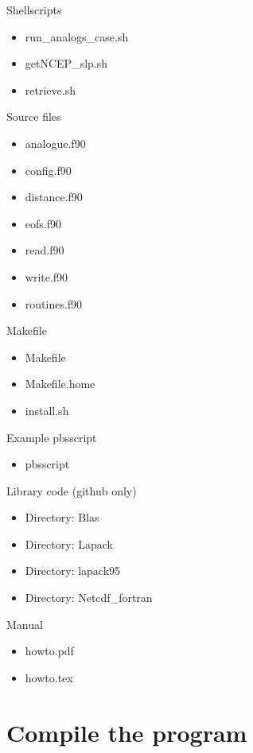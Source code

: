 \documentclass[11p,a4paper]{article}
\begin{document}
Shellscripts
\begin{itemize}
 \item run\_analogs\_case.sh
 \item getNCEP\_slp.sh 
 \item retrieve.sh
\end{itemize}
Source files
\begin{itemize}
 \item analogue.f90  
 \item config.f90  
 \item distance.f90  
 \item eofs.f90  
 \item read.f90  
 \item write.f90
 \item routines.f90 
\end{itemize}
Makefile
\begin{itemize}
 \item Makefile
 \item Makefile.home
 \item install.sh
\end{itemize}
Example pbsscript
\begin{itemize}
 \item pbsscript
\end{itemize}
Library code (github only)
\begin{itemize}
 \item Directory: Blas
 \item Directory: Lapack
 \item Directory: lapack95
 \item Directory: Netcdf\_fortran
\end{itemize}
Manual
\begin{itemize}
 \item howto.pdf
 \item howto.tex
\end{itemize}

\section{Compile the program}
\label{sec:compil}
\end{document}

